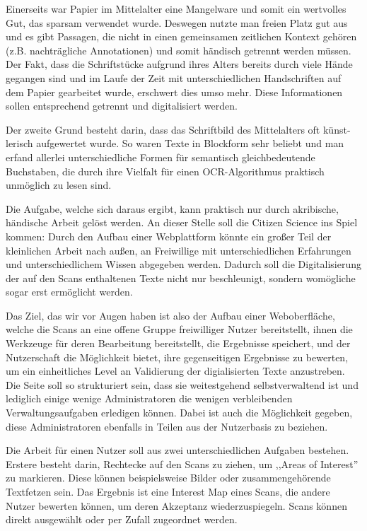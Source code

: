 \documentclass{article}
\begin{document}
Einerseits war Papier im Mittelalter eine Mangelware und somit ein wertvolles Gut, das sparsam verwendet wurde.
Deswegen nutzte man freien Platz gut aus und es gibt Passagen,
die nicht in einen gemeinsamen zeitlichen Kontext gehören (z.B. nachträgliche Annotationen) und somit händisch getrennt werden müssen.
Der Fakt, dass die Schriftstücke aufgrund ihres Alters bereits durch viele Hände gegangen sind und im Laufe der Zeit
mit unterschiedlichen Handschriften auf dem Papier gearbeitet wurde, erschwert dies umso mehr.
Diese Informationen sollen entsprechend getrennt und digitalisiert werden.

Der zweite Grund besteht darin, dass das Schriftbild des Mittelalters oft künst-lerisch aufgewertet wurde.
So waren Texte in Blockform sehr beliebt und man erfand allerlei unterschiedliche Formen für semantisch gleichbedeutende Buchstaben,
die durch ihre Vielfalt für einen OCR-Algorithmus praktisch unmöglich zu lesen sind.

Die Aufgabe, welche sich daraus ergibt, kann praktisch nur durch akribische, händische Arbeit gelöst werden.
An dieser Stelle soll die Citizen Science ins Spiel kommen:
Durch den Aufbau einer Webplattform könnte ein großer Teil der kleinlichen Arbeit nach außen,
an Freiwillige mit unterschiedlichen Erfahrungen und unterschiedlichem Wissen abgegeben werden.
Dadurch soll die Digitalisierung der auf den Scans enthaltenen Texte nicht nur beschleunigt, sondern womögliche sogar erst ermöglicht werden.

Das Ziel, das wir vor Augen haben ist also der Aufbau einer Weboberfläche, welche die Scans an eine offene Gruppe freiwilliger Nutzer bereitstellt,
ihnen die Werkzeuge für deren Bearbeitung bereitstellt, die Ergebnisse speichert, und der Nutzerschaft die Möglichkeit bietet,
ihre gegenseitigen Ergebnisse zu bewerten, um ein einheitliches Level an Validierung der digialisierten Texte anzustreben.
Die Seite soll so strukturiert sein, dass sie weitestgehend selbstverwaltend ist und lediglich einige wenige Administratoren%
die wenigen verbleibenden Verwaltungsaufgaben erledigen können.
Dabei ist auch die Möglichkeit gegeben, diese Administratoren ebenfalls in Teilen aus der Nutzerbasis zu beziehen.

Die Arbeit für einen Nutzer soll aus zwei unterschiedlichen Aufgaben bestehen.
Erstere besteht darin, Rechtecke auf den Scans zu ziehen, um ,,Areas of Interest'' zu markieren.
Diese können beispielsweise Bilder oder zusammengehörende Textfetzen sein.
Das Ergebnis ist eine Interest Map eines Scans, die andere Nutzer bewerten können, um deren Akzeptanz wiederzuspiegeln.
Scans können direkt ausgewählt oder per Zufall zugeordnet werden.
\end{document}
